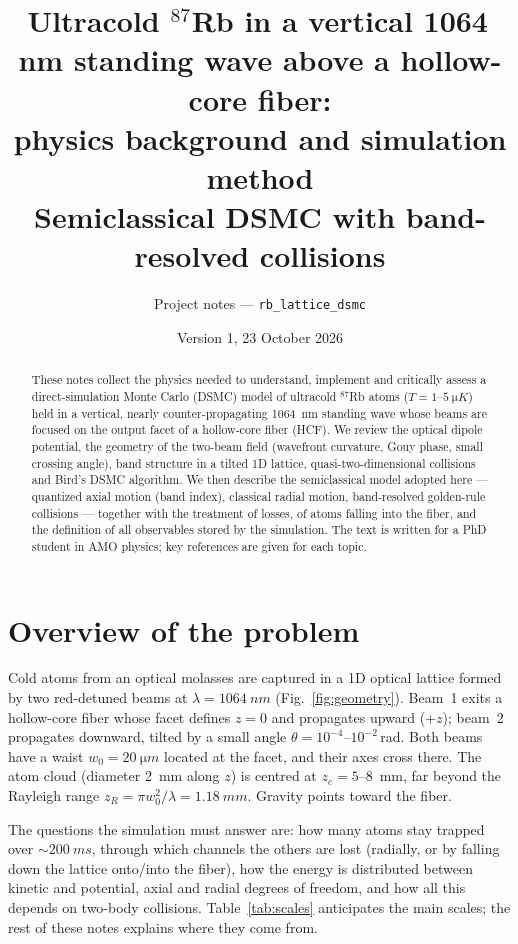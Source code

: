 \documentclass[11pt,a4paper]{article}
\title{Ultracold $^{87}$Rb in a vertical 1064\,nm standing wave above a hollow-core fiber:\\
physics background and simulation method\\[4pt]
\large Semiclassical DSMC with band-resolved collisions}
\author{Project notes --- \texttt{rb\_lattice\_dsmc}}
\date{Version 1, 23 October 2026}
\begin{document}
\maketitle

\begin{abstract}
These notes collect the physics needed to understand, implement and critically assess a direct-simulation Monte Carlo (DSMC) model of ultracold $^{87}$Rb atoms ($T=1$--$\SI{5}{\micro K}$) held in a vertical, nearly counter-propagating \SI{1064}{nm} standing wave whose beams are focused on the output facet of a hollow-core fiber (HCF). We review the optical dipole potential, the geometry of the two-beam field (wavefront curvature, Gouy phase, small crossing angle), band structure in a tilted 1D lattice, quasi-two-dimensional collisions and Bird's DSMC algorithm. We then describe the semiclassical model adopted here --- quantized axial motion (band index), classical radial motion, band-resolved golden-rule collisions --- together with the treatment of losses, of atoms falling into the fiber, and the definition of all observables stored by the simulation. The text is written for a PhD student in AMO physics; key references are given for each topic.
\end{abstract}

\tableofcontents
\newpage

\section{Overview of the problem}
\label{sec:overview}

Cold atoms from an optical molasses are captured in a 1D optical lattice formed by two red-detuned beams at $\lambda=\SI{1064}{nm}$ (Fig.~\ref{fig:geometry}). Beam~1 exits a hollow-core fiber whose facet defines $z=0$ and propagates upward ($+z$); beam~2 propagates downward, tilted by a small angle $\theta=10^{-4}$--$10^{-2}$\,rad. Both beams have a waist $w_0=\SI{20}{\micro m}$ located at the facet, and their axes cross there. The atom cloud (diameter \SI{2}{mm} along $z$) is centred at $z_c=5$--\SI{8}{mm}, far beyond the Rayleigh range $z_R=\pi w_0^2/\lambda=\SI{1.18}{mm}$. Gravity points toward the fiber.

The questions the simulation must answer are: how many atoms stay trapped over $\sim\SI{200}{ms}$, through which channels the others are lost (radially, or by falling down the lattice onto/into the fiber), how the energy is distributed between kinetic and potential, axial and radial degrees of freedom, and how all this depends on two-body collisions. Table~\ref{tab:scales} anticipates the main scales; the rest of these notes explains where they come from.
\end{document}
